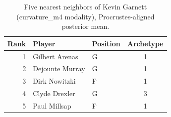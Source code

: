 \begin{table}[htbp]
  \centering\small
  \begin{tabular}{rllc}
    \toprule
    Rank & Player & Position & Archetype \\
    \midrule
    1 & Gilbert Arenas & G & 1 \\
    2 & Dejounte Murray & G & 1 \\
    3 & Dirk Nowitzki & F & 1 \\
    4 & Clyde Drexler & G & 3 \\
    5 & Paul Millsap & F & 1 \\
    \bottomrule
  \end{tabular}
  \caption{Five nearest neighbors of Kevin Garnett (curvature_m4 modality), Procrustes-aligned posterior mean.}
  \label{tab:Kevin_Garnett_neighbors_curvature_m4}
\end{table}

